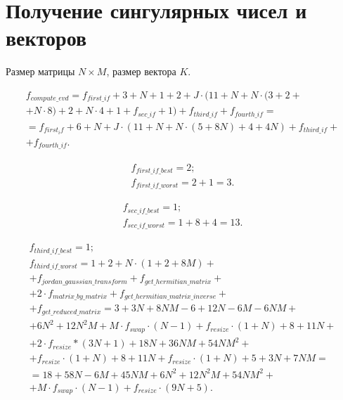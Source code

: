 \section{Получение сингулярных чисел и векторов}

Размер матрицы $N \times M$, размер вектора $K$.

\begin{equation}
	\begin{gathered}
		f_{compute\_evd} = f_{first\_if} + 3 + N + 1 + 2 + J \cdot (11 + N + N \cdot (3 + 2 +\\+ N \cdot 8) + 2 + N \cdot 4 + 1 + f_{sec\_if} + 1) + f_{third\_if} + f_{fourth\_if} =\\=
		f_{first_if} + 6 + N + J \cdot (11 + N + N \cdot (5 + 8N) + 4 + 4N) + f_{third\_if} +\\+ f_{fourth\_if}.
	\end{gathered}
\end{equation}

\begin{equation}
	\begin{gathered}
		f_{first\_if\_best} = 2;\\
		f_{first\_if\_worst} = 2 + 1 = 3.
	\end{gathered}
\end{equation}

\begin{equation}
	\begin{gathered}
		f_{sec\_if\_best} = 1;\\
		f_{sec\_if\_worst} = 1 + 8 + 4 = 13.
	\end{gathered}
\end{equation}

\begin{equation}
	\begin{gathered}
		f_{third\_if\_best} = 1;\\
		f_{third\_if\_worst} = 1 + 2 + N \cdot (1 + 2 + 8M) +\\+ f_{jordan\_gaussian\_transform} + f_{get\_hermitian\_matrix} +\\+ 2 \cdot f_{matrix\_by\_matrix} + f_{get\_hermitian\_matrix\_inverse} +\\+ f_{get\_reduced\_matrix} = 3 + 3N + 8NM -6 + 12N - 6M - 6NM +\\+ 6N^2 + 12N^2M + M \cdot f_{swap} \cdot (N - 1) + f_{resize} \cdot (1 + N) + 8 + 11N +\\+ 2 \cdot f_{resize} * (3N + 1) + 18N + 36NM + 54NM^2 +\\+ f_{resize} \cdot (1 + N) + 8 + 11N + f_{resize} \cdot (1 + N) + 5 + 3N + 7NM =\\= 18 + 58N - 6M + 45NM + 6N^2 + 12N^2M + 54NM^2 +\\+ M \cdot f_{swap} \cdot (N - 1) + f_{resize} \cdot (9N + 5).
	\end{gathered}
\end{equation}

